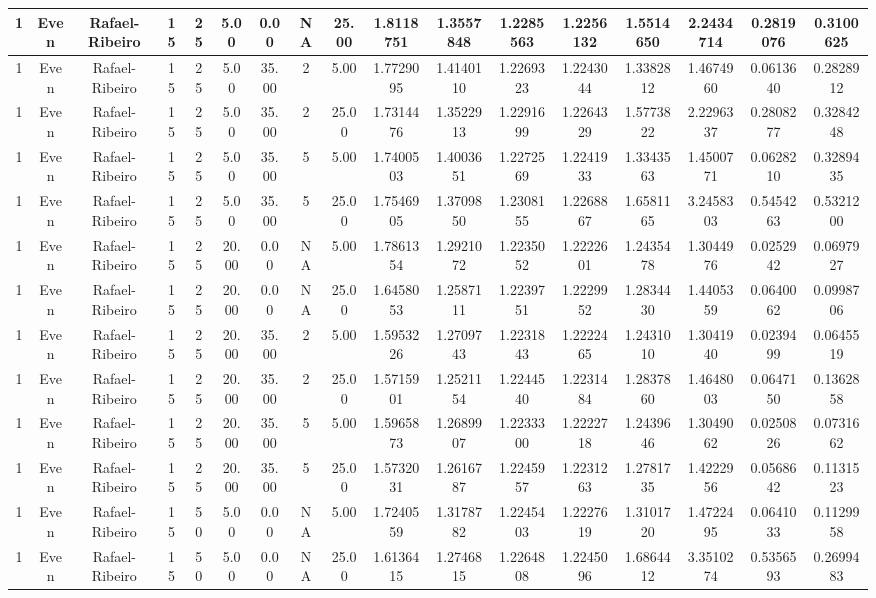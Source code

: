 \begin{longtable}{ | c | c | c | c | c | c | c | c | c | c | c | c | c | c | c | c | c | }
	\hline
	1	&	Even	&	Rafael-Ribeiro	&	15	&	25	&	5.00	&	0.00	&	NA	&	25.00	&	1.8118751	&	1.3557848	&	1.2285563	&	1.2256132	&	1.5514650	&	2.2434714	&	0.2819076	&	0.3100625 \\
	\hline
	1	&	Even	&	Rafael-Ribeiro	&	15	&	25	&	5.00	&	35.00	&	2	&	5.00	&	1.7729095	&	1.4140110	&	1.2269323	&	1.2243044	&	1.3382812	&	1.4674960	&	0.0613640	&	0.2828912 \\
	\hline
	1	&	Even	&	Rafael-Ribeiro	&	15	&	25	&	5.00	&	35.00	&	2	&	25.00	&	1.7314476	&	1.3522913	&	1.2291699	&	1.2264329	&	1.5773822	&	2.2296337	&	0.2808277	&	0.3284248 \\
	\hline
	1	&	Even	&	Rafael-Ribeiro	&	15	&	25	&	5.00	&	35.00	&	5	&	5.00	&	1.7400503	&	1.4003651	&	1.2272569	&	1.2241933	&	1.3343563	&	1.4500771	&	0.0628210	&	0.3289435 \\
	\hline
	1	&	Even	&	Rafael-Ribeiro	&	15	&	25	&	5.00	&	35.00	&	5	&	25.00	&	1.7546905	&	1.3709850	&	1.2308155	&	1.2268867	&	1.6581165	&	3.2458303	&	0.5454263	&	0.5321200 \\
	\hline
	1	&	Even	&	Rafael-Ribeiro	&	15	&	25	&	20.00	&	0.00	&	NA	&	5.00	&	1.7861354	&	1.2921072	&	1.2235052	&	1.2222601	&	1.2435478	&	1.3044976	&	0.0252942	&	0.0697927 \\
	\hline
	1	&	Even	&	Rafael-Ribeiro	&	15	&	25	&	20.00	&	0.00	&	NA	&	25.00	&	1.6458053	&	1.2587111	&	1.2239751	&	1.2229952	&	1.2834430	&	1.4405359	&	0.0640062	&	0.0998706 \\
	\hline
	1	&	Even	&	Rafael-Ribeiro	&	15	&	25	&	20.00	&	35.00	&	2	&	5.00	&	1.5953226	&	1.2709743	&	1.2231843	&	1.2222465	&	1.2431010	&	1.3041940	&	0.0239499	&	0.0645519 \\
	\hline
	1	&	Even	&	Rafael-Ribeiro	&	15	&	25	&	20.00	&	35.00	&	2	&	25.00	&	1.5715901	&	1.2521154	&	1.2244540	&	1.2231484	&	1.2837860	&	1.4648003	&	0.0647150	&	0.1362858 \\
	\hline
	1	&	Even	&	Rafael-Ribeiro	&	15	&	25	&	20.00	&	35.00	&	5	&	5.00	&	1.5965873	&	1.2689907	&	1.2233300	&	1.2222718	&	1.2439646	&	1.3049062	&	0.0250826	&	0.0731662 \\
	\hline
	1	&	Even	&	Rafael-Ribeiro	&	15	&	25	&	20.00	&	35.00	&	5	&	25.00	&	1.5732031	&	1.2616787	&	1.2245957	&	1.2231263	&	1.2781735	&	1.4222956	&	0.0568642	&	0.1131523 \\
	\hline
	1	&	Even	&	Rafael-Ribeiro	&	15	&	50	&	5.00	&	0.00	&	NA	&	5.00	&	1.7240559	&	1.3178782	&	1.2245403	&	1.2227619	&	1.3101720	&	1.4722495	&	0.0641033	&	0.1129958 \\
	\hline
	1	&	Even	&	Rafael-Ribeiro	&	15	&	50	&	5.00	&	0.00	&	NA	&	25.00	&	1.6136415	&	1.2746815	&	1.2264808	&	1.2245096	&	1.6864412	&	3.3510274	&	0.5356593	&	0.2699483 \\

\end{longtable}
